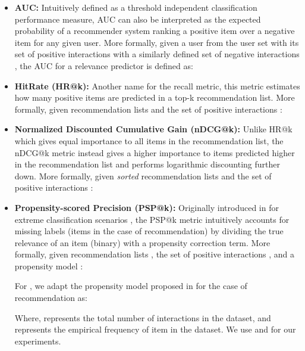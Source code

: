 \documentclass{article}
\begin{document}
\begin{itemize}[leftmargin=.3in]
    \item \textbf{AUC:} Intuitively defined as a threshold independent classification performance measure, AUC can also be interpreted as the expected probability of a recommender system ranking a positive item over a negative item for any given user. More formally, given a user  from the user set  with its set of positive interactions  with a similarly defined set of negative interactions , the AUC for a relevance predictor  is defined as:
    
    
    
    \item \textbf{HitRate (HR@k):} Another name for the recall metric, this metric estimates how many positive items are predicted in a top-k recommendation list. More formally, given recommendation lists  and the set of positive interactions :
    
    
    
    \item \textbf{Normalized Discounted Cumulative Gain (nDCG@k):} Unlike HR@k which gives equal importance to all items in the recommendation list, the nDCG@k metric instead gives a higher importance to items predicted higher in the recommendation list and performs logarithmic discounting further down. More formally, given \emph{sorted} recommendation lists  and the set of positive interactions :
    
    
    
    \item \textbf{Propensity-scored Precision (PSP@k):} Originally introduced in \cite{pfastre} for extreme classification scenarios \cite{parabel, slice, eclare}, the PSP@k metric intuitively accounts for missing labels (items in the case of recommendation) by dividing the true relevance of an item (binary) with a propensity correction term. More formally, given recommendation lists , the set of positive interactions , and a propensity model :
    
    
    
    For , we adapt the propensity model proposed in \cite{pfastre} for the case of recommendation as:
    
    
    
    Where,  represents the total number of interactions in the dataset, and  represents the empirical frequency of item  in the dataset. We use  and  for our experiments.
\end{itemize}
\end{document}
